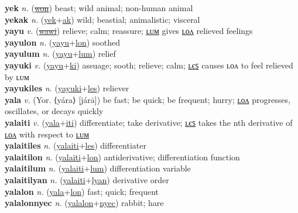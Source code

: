 \textbf{yek} \textit{n.} (\hyperref[won]{\sout{won}})
beast; wild animal; non-human animal \label{yek} \\
\textbf{yekak} \textit{n.} (\hyperref[yek]{yek}+\hyperref[ak]{ak})
wild; beastial; animalistic; visceral \label{yekak} \\
\textbf{yayu} \textit{v.} (\hyperref[wawi]{\sout{wawi}})
relieve; calm; reassure; \hyperref[yayulum]{ʟᴜᴍ} gives \hyperref[yayulon]{ʟᴏᴧ} relieved feelings \label{yayu} \\
\textbf{yayulon} \textit{n.} (\hyperref[yayu]{yayu}+\hyperref[lon]{lon})
soothed \label{yayulon} \\
\textbf{yayulum} \textit{n.} (\hyperref[yayu]{yayu}+\hyperref[lum]{lum})
relief \label{yayulum} \\
\textbf{yayuki} \textit{v.} (\hyperref[yayu]{yayu}+\hyperref[ki]{ki})
assuage; sooth; relieve; calm; \hyperref[yayukiles]{ʟєꜱ} causes ʟᴏᴧ to feel relieved by ʟᴜᴍ \label{yayuki} \\
\textbf{yayukiles} \textit{n.} (\hyperref[yayuki]{yayuki}+\hyperref[les]{les})
reliever \label{yayukiles} \\
\textbf{yala} \textit{v.} (Yor. ⟨yára⟩ [járā])
be fast; be quick; be frequent; hurry; \hyperref[yalalon]{ʟᴏᴧ} progresses, oscillates, or decays quickly \label{yala} \\
\textbf{yalaiti} \textit{v.} (\hyperref[yala]{yala}+\hyperref[iti]{iti})
differentiate; take derivative; \hyperref[yalaitiles]{ʟєꜱ} takes the nth derivative of \hyperref[yalaitilon]{ʟᴏᴧ} with respect to \hyperref[yalaitilum]{ʟᴜᴍ} \label{yalaiti} \\
\textbf{yalaitiles} \textit{n.} (\hyperref[yalaiti]{yalaiti}+\hyperref[les]{les})
differentiater \label{yalaitiles} \\
\textbf{yalaitilon} \textit{n.} (\hyperref[yalaiti]{yalaiti}+\hyperref[lon]{lon})
antiderivative; differentiation function \label{yalaitilon} \\
\textbf{yalaitilum} \textit{n.} (\hyperref[yalaiti]{yalaiti}+\hyperref[lum]{lum})
differentiation variable \label{yalaitilum} \\
\textbf{yalaitilyan} \textit{n.} (\hyperref[yalaiti]{yalaiti}+\hyperref[lyan]{lyan})
derivative order \label{yalaitilyan} \\
\textbf{yalalon} \textit{n.} (\hyperref[yala]{yala}+\hyperref[lon]{lon})
fast; quick; frequent \label{yalalon} \\
\textbf{yalalonnyec} \textit{n.} (\hyperref[yalalon]{yalalon}+\hyperref[nyec]{nyec})
rabbit; hare \label{yalalonnyec} \\

